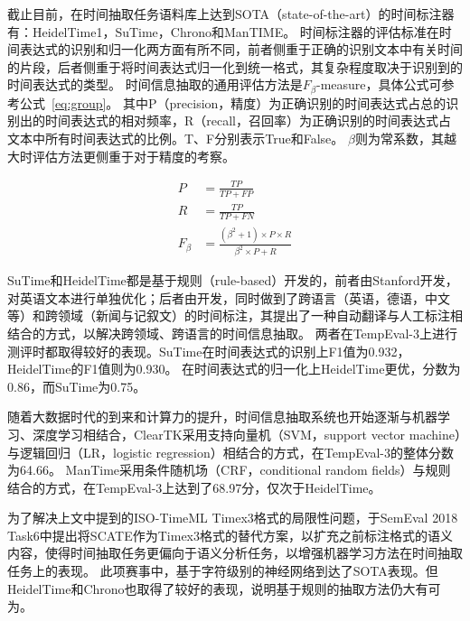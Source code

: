 截止目前，在时间抽取任务语料库上达到SOTA（state-of-the-art）的时间标注器有：HeidelTime1\cite{strotgen2010heideltime}，SuTime\cite{chang2012sutime}，Chrono\cite{olex2018chrono}和ManTIME\cite{filannino2013mantime}。
时间标注器的评估标准在时间表达式的识别和归一化两方面有所不同，前者侧重于正确的识别文本中有关时间的片段，后者侧重于将时间表达式归一化到统一格式，其复杂程度取决于识别到的时间表达式的类型。
时间信息抽取的通用评估方法是$F_β$-measure，具体公式可参考公式~\ref{eq:group}。
其中P（precision，精度）为正确识别的时间表达式占总的识别出的时间表达式的相对频率，R（recall，召回率）为正确识别的时间表达式占文本中所有时间表达式的比例。T、F分别表示True和False。
$\beta$则为常系数，其越大时评估方法更侧重于对于精度的考察。

\begin{subequations}\label{eq:group}
    \begin{alignat}{1}
        P       & = \frac{TP}{TP + FP}                                           \\
        R       & = \frac{TP}{TP + FN}                                           \\
        F_\beta & = \frac{(\beta^2 + 1) \times P \times R}{\beta^2 \times P + R}
    \end{alignat}
\end{subequations}

SuTime和HeidelTime都是基于规则（rule-based）开发的，前者由Stanford开发，对英语文本进行单独优化；后者由\citet{strotgen2010heideltime}开发，同时做到了跨语言（英语，德语，中文等）和跨领域（新闻与记叙文）的时间标注，其提出了一种自动翻译与人工标注相结合的方式，以解决跨领域、跨语言的时间信息抽取。
两者在TempEval-3上进行测评时都取得较好的表现。SuTime在时间表达式的识别上F1值为0.932，HeidelTime的F1值则为0.930。
在时间表达式的归一化上HeidelTime更优，分数为0.86，而SuTime为0.75。

随着大数据时代的到来和计算力的提升，时间信息抽取系统也开始逐渐与机器学习、深度学习相结合，ClearTK\cite{bethard2013cleartk}采用支持向量机（SVM，support vector machine）与逻辑回归（LR，logistic regression）相结合的方式，在TempEval-3的整体分数为64.66。
ManTime\cite{filannino2013mantime}采用条件随机场（CRF，conditional random fields）与规则结合的方式，在TempEval-3上达到了68.97分，仅次于HeidelTime。

为了解决上文中提到的ISO-TimeML Timex3格式的局限性问题，\citet{laparra2018characters}于SemEval 2018 Task6中提出将SCATE作为Timex3格式的替代方案，以扩充之前标注格式的语义内容，使得时间抽取任务更偏向于语义分析任务，以增强机器学习方法在时间抽取任务上的表现。
此项赛事中，\citet{laparra2018characters}基于字符级别的神经网络到达了SOTA表现。但HeidelTime和Chrono也取得了较好的表现，说明基于规则的抽取方法仍大有可为。

